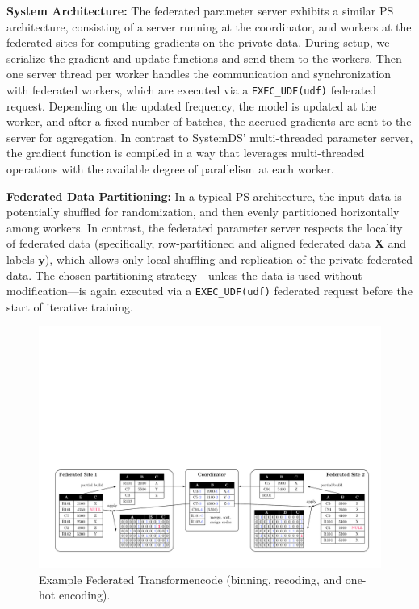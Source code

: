 \documentclass[sigconf,screen]{acmart}
\newcommand{\mat}[1]{\ensuremath{\mathbf{#1}}}
\begin{document}
\textbf{System Architecture:} The federated parameter server exhibits a similar PS architecture, consisting of a server running at the coordinator, and workers at the federated sites for computing gradients on the private data. During setup, we serialize the gradient and update functions and send them to the workers. Then one server thread per worker handles the communication and synchronization with federated workers, which are executed via a \texttt{EXEC\_UDF(udf)} federated request. Depending on the updated frequency, the model is updated at the worker, and after a fixed number of batches, the accrued gradients are sent to the server for aggregation. In contrast to SystemDS' multi-threaded parameter server, the gradient function is compiled in a way that leverages multi-threaded operations with the available degree of parallelism at each worker.

\textbf{Federated Data Partitioning:} In a typical PS architecture, the input data is potentially shuffled for randomization, and then evenly partitioned horizontally among workers. In contrast, the federated parameter server respects the locality of federated data (specifically, row-partitioned and aligned federated data $\mat{X}$ and labels $\mat{y}$), which allows only local shuffling and replication of the private federated data. The chosen partitioning strategy---unless the data is used without modification---is again executed via a \texttt{EXEC\_UDF(udf)} federated request before the start of iterative training. 


\begin{figure}[!t]
	\centering
	\includegraphics[scale=0.43]{figures/fig03}
	\vspace{-0.25cm}
	\caption{\label{fig:transform}Example Federated Transformencode (binning, recoding, and one-hot encoding).}
	\vspace{-0.15cm}
\end{figure}
\end{document}
